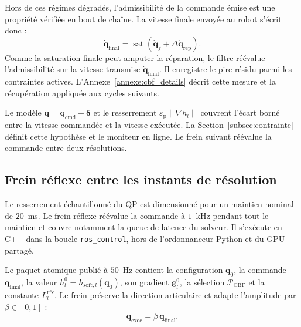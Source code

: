 Hors de ces régimes dégradés, l'admissibilité de la commande émise est une propriété vérifiée en bout de chaîne. La vitesse finale envoyée au robot s'écrit donc :
\begin{equation}
\dot{\mathbf{q}}_{\mathrm{final}} = \operatorname{sat}\!\left(\dot{\mathbf{q}}_{f} + \Delta\dot{\mathbf{q}}_{\mathrm{rep}}\right).
\end{equation}
Comme la saturation finale peut amputer la réparation, le filtre réévalue l'admissibilité sur la vitesse transmise $\dot{\mathbf{q}}_{\mathrm{final}}$. Il enregistre le pire résidu parmi les contraintes actives. L'Annexe~\ref{annexe:cbf_details} décrit cette mesure et la récupération appliquée aux cycles suivants.

Le modèle $\dot{\mathbf{q}}=\dot{\mathbf{q}}_{\mathrm{cmd}}+\boldsymbol{\delta}$ et le resserrement $\varepsilon_{\mathrm{p}}\|\nabla h_l\|$ couvrent l'écart borné entre la vitesse commandée et la vitesse exécutée. La Section~\ref{subsec:contrainte} définit cette hypothèse et le moniteur en ligne. Le frein suivant réévalue la commande entre deux résolutions.

\subsection{Frein réflexe entre les instants de résolution}\label{subsubsec:reflexe}
Le resserrement échantillonné du QP est dimensionné pour un maintien nominal de $20$~ms. Le frein réflexe réévalue la commande à $1$~kHz pendant tout le maintien et couvre notamment la queue de latence du solveur. Il s'exécute en C++ dans la boucle \texttt{ros\_control}, hors de l'ordonnanceur Python et du \ac{GPU} partagé.

Le paquet atomique publié à $50$~Hz contient la configuration $\mathbf{q}_0$, la commande $\dot{\mathbf{q}}_{\mathrm{final}}$, la valeur $h_l^0=h_{\mathrm{soft},l}(\mathbf{q}_0)$, son gradient $\mathbf{g}_l^0$, la sélection $\mathcal{P}_{\mathrm{CBF}}$ et la constante $L_l^{\mathrm{rfx}}$. Le frein préserve la direction articulaire et adapte l'amplitude par $\beta\in[0,1]$ :
\begin{equation}
\dot{\mathbf{q}}_{\mathrm{exec}} = \beta\,\dot{\mathbf{q}}_{\mathrm{final}}.
\end{equation}

